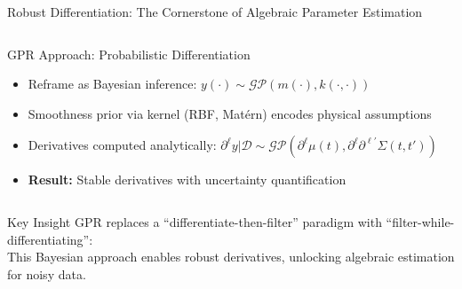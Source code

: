 \documentclass[aspectratio=169]{beamer}
\begin{document}
\begin{frame}{Robust Differentiation: The Cornerstone of Algebraic Parameter Estimation}
\begin{columns}[t]
    \begin{column}{0.48\textwidth}
      \vspace{-0.5em}
      \begin{block}{\textcolor{successgreen}{GPR Approach: Probabilistic Differentiation}}
        \tiny
        \begin{itemize}
          \item Reframe as Bayesian inference: $y(\cdot) \sim \mathcal{GP}(m(\cdot), k(\cdot,\cdot))$
          \item Smoothness prior via kernel (RBF, Matérn) encodes physical assumptions
          \item Derivatives computed analytically: $\partial^{\ell}y | \mathcal{D} \sim \mathcal{GP}(\partial^{\ell}\mu(t), \partial^{\ell}\partial^{\ell'}\Sigma(t,t'))$
          \item \textbf{Result:} Stable derivatives with uncertainty quantification
        \end{itemize}
      \end{block}
      
      \vspace{0.5em}
      \begin{center}
      \end{center}
    \end{column}
    
  \end{columns}
  
  \vspace{1em}
  \begin{alertblock}{Key Insight}
    \centering
    \small
    GPR replaces a ``differentiate-then-filter'' paradigm with ``filter-while-differentiating'': \\
    This Bayesian approach enables robust derivatives, unlocking algebraic estimation for noisy data.
  \end{alertblock}
  
\end{frame}
\end{document}
